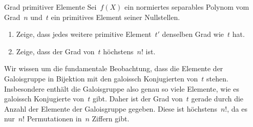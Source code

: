 \documentclass{algblatt}
\begin{document}
\begin{aufgabe}{Grad primitiver Elemente}
Sei~$f(X)$ ein normiertes separables Polynom vom Grad~$n$ und~$t$ ein
primitives Element seiner Nullstellen.
\begin{enumerate}
\item Zeige, dass jedes weitere primitive Element~$t'$ denselben Grad wie~$t$
hat.
\item Zeige, dass der Grad von~$t$ höchstens~$n!$ ist.
\end{enumerate}

\begin{loesung}
Wir wissen um die fundamentale Beobachtung, dass die Elemente der
Galoisgruppe in Bijektion mit den galoissch Konjugierten von~$t$ stehen.
Insbesondere enthält die Galoisgruppe also genau so viele Elemente, wie es
galoissch Konjugierte von~$t$ gibt. Daher ist der Grad von~$t$ gerade durch
die Anzahl der Elemente der Galoisgruppe gegeben. Diese ist höchstens~$n!$, da
es nur~$n!$ Permutationen in~$n$ Ziffern gibt.
\end{loesung}
\end{aufgabe}
\end{document}
